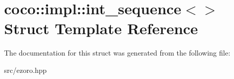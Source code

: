 \hypertarget{structcoco_1_1impl_1_1int__sequence}{\section{coco\-:\-:impl\-:\-:int\-\_\-sequence$<$$>$ Struct Template Reference}
\label{structcoco_1_1impl_1_1int__sequence}
}


The documentation for this struct was generated from the following file\-:\begin{DoxyCompactItemize}
\item 
src/ezoro.\-hpp\end{DoxyCompactItemize}
